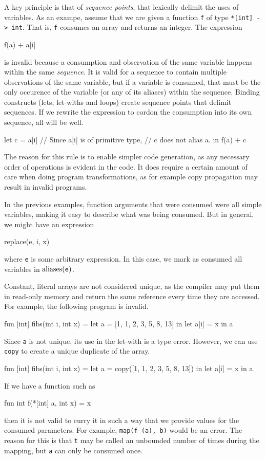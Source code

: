 A key principle is that of \textit{sequence points}, that lexically
delimit the uses of variables.  As an exampe, assume that we are given
a function \texttt{f} of type \texttt{*[int] -> int}.  That is,
\texttt{f} consumes an array and returns an integer.  The expression
\begin{colorcode}
  f(a) + a[i]
\end{colorcode}
is invalid because a consumption and observation of the same variable
happens within the same \textit{sequence}.  It is valid for a sequence
to contain multiple observations of the same variable, but if a
variable is consumed, that must be the only occurence of the variable
(or any of its aliases) within the sequence.  Binding constructs
(lets, let-withs and loops) create sequence points that delimit
sequences.  If we rewrite the expression to cordon the consumption
into its own sequence, all will be well.
\begin{colorcode}
  let c = a[i] // Since a[i] is of primitive type,
               // c does not alias a.
  in f(a) + c
\end{colorcode}

The reason for this rule is to enable simpler code generation, as any
necessary order of operations is evident in the code.  It does require
a certain amount of care when doing program transformations, as for
example copy propagation may result in invalid programs.

In the previous examples, function arguments that were consumed were
all simple variables, making it easy to describe what was being
consumed.  But in general, we might have an expression
\begin{colorcode}
  replace(e, i, x)
\end{colorcode}
where \texttt{e} is some arbitrary expression.  In this case, we mark
as consumed all variables in $\textrm{aliases}(\texttt{e})$.

Constant, literal arrays are not considered unique, as the compiler
may put them in read-only memory and return the same reference every
time they are accessed.  For example, the following program is
invalid.
\begin{colorcode}
  fun [int] fibs(int i, int x) =
    let a = [1, 1, 2, 3, 5, 8, 13] in
    let a[i] = x in a
\end{colorcode}
Since \texttt{a} is not unique, its use in the let-with is a type
error.  However, we can use \texttt{copy} to create a unique duplicate
of the array.
\begin{colorcode}
  fun [int] fibs(int i, int x) =
    let a = copy([1, 1, 2, 3, 5, 8, 13]) in
    let a[i] = x in a
\end{colorcode}

If we have a function such as
\begin{colorcode}
  fun int f(*[int] a, int x) = x
\end{colorcode}
then it is not valid to curry it in such a way that we provide values
for the consumed parameters.  For example, \texttt{map(f (a), b)}
would be an error.  The reason for this is that \texttt{t} may be
called an unbounded number of times during the mapping, but \texttt{a}
can only be consumed once.


